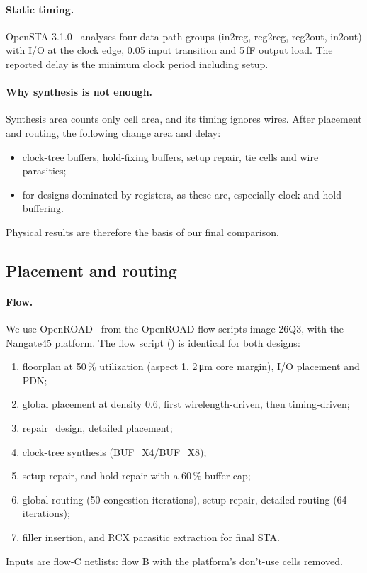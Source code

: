 \paragraph{Static timing.} OpenSTA 3.1.0~\cite{opensta} analyses four data-path groups (in2reg, reg2reg, reg2out, in2out) with I/O at the clock edge, 0.05\ns{} input transition and 5\,fF output load. The reported delay is the minimum clock period including setup.

\paragraph{Why synthesis is not enough.} Synthesis area counts only cell area, and its timing ignores wires. After placement and routing, the following change area and delay:
\begin{itemize}
  \item clock-tree buffers, hold-fixing buffers, setup repair, tie cells and wire parasitics;
  \item for designs dominated by registers, as these are, especially clock and hold buffering.
\end{itemize}
Physical results are therefore the basis of our final comparison.

\subsection{Placement and routing}
\paragraph{Flow.} We use OpenROAD~\cite{ajayi2019openroad} from the OpenROAD-flow-scripts image 26Q3, with the Nangate45 platform. The flow script () is identical for both designs:
\begin{enumerate}
  \item floorplan at 50\,\% utilization (aspect 1, 2\,\si{\micro\meter} core margin), I/O placement and PDN;
  \item global placement at density 0.6, first wirelength-driven, then timing-driven;
  \item repair\_design, detailed placement;
  \item clock-tree synthesis (BUF\_X4/BUF\_X8);
  \item setup repair, and hold repair with a 60\,\% buffer cap;
  \item global routing (50 congestion iterations), setup repair, detailed routing (64 iterations);
  \item filler insertion, and RCX parasitic extraction for final STA.
\end{enumerate}
Inputs are flow-C netlists: flow B with the platform's don't-use cells removed.


